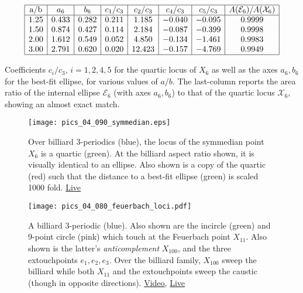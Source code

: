 \begin{table}
    \centering
$$
\begin{array}{|c|c|c|c|c|c|c|c|}
\hline
 \text{a/b} & a_6 & b_6 & c_1/c_3 & c_2/c_3 & c_4/c_3 & c_5/c_3 & A(\mathcal{E}_6)/A(\mathcal{X}_6) \\
 \hline
  1.25 & 0.433 & 0.282 & 0.211 & 1.185 & -0.040 & -0.095 & 0.9999 \\
 1.50 & 0.874 & 0.427 & 0.114 & 2.184 & -0.087 & -0.399 & 0.9998 \\
 2.00 & 1.612 & 0.549 & 0.052 & 4.850 & -0.134 & -1.461 & 0.9983 \\
 3.00 & 2.791 & 0.620 & 0.020 & 12.423 & -0.157 & -4.769 & 0.9949 \\
 \hline
\end{array}
$$
\caption{Coefficients $c_i/c_3$, $i=1,2,4,5$ for the quartic locus of $X_6$ as well as the axes $a_6,b_6$ for the best-fit ellipse, for various values of $a/b$. The last-column reports the area ratio of the internal ellipse $\mathcal{E}_6$ (with axes $a_6,b_6$) to that of the quartic locus $\mathcal{X}_6$, showing an almost exact match.}
\label{tab:quartic-coeffs}
\end{table}


\begin{figure}
    \centering
    \texttt{[image: pics\_04\_090\_symmedian.eps]}
    \caption{Over billiard 3-periodics (blue), the locus of the symmedian point $X_6$ is a quartic (green). At the billiard aspect ratio shown, it is visually identical to an ellipse. Also shown is a copy of the quartic (red) such that the distance to a best-fit ellipse (green) is scaled 1000 fold. \href{https://bit.ly/3hxOZoV}{Live}}
    \label{fig:04-locus-x6}
\end{figure}

\begin{figure}
    \centering
    \texttt{[image: pics\_04\_080\_feuerbach\_loci.pdf]}
    \caption{A billiard 3-periodic (blue). Also shown are the incircle (green) and 9-point circle (pink) which touch at the Feuerbach point $X_{11}$. Also shown is the latter's {\em anticomplement} $X_{100}$, and the three extouchpoints $e_1,e_2,e_3$. Over the billiard family, $X_{100}$ sweep the billiard while both $X_{11}$ and the extouchpoints sweep the caustic (though in opposite directions).
    \href{https://youtu.be/TXdg7tUl8lc}{Video},
    \label{fig:04-feuer-loci} \href{https://bit.ly/2S2LVqp}{Live}}
\end{figure}

